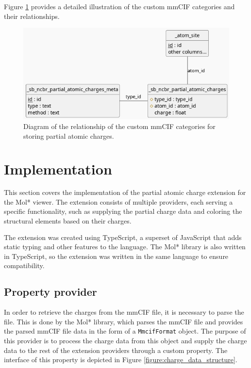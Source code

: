 \documentclass[
  digital,     %
  oneside,     %
  nosansbold,  %
  nocolorbold, %
  lof,         %
  lot,         %
]{fithesis4}
\begin{document}
Figure \ref{fig:mmcif_erd} provides a detailed illustration of the custom mmCIF categories and their relationships.


\begin{figure}
  \begin{center}
    \includegraphics[width=\textwidth]{figures/mmcif_erd.png}
  \end{center}
  \caption[Custom mmCIF category relationships.]{Diagram of the relationship of the custom mmCIF categories for storing partial atomic charges.}
  \label{fig:mmcif_erd}
\end{figure}

\section{Implementation}
\label{section:implementation}


This section covers the implementation of the partial atomic charge extension for the Mol* viewer. The extension consists of multiple providers, each serving a specific functionality, such as supplying the partial charge data and coloring the structural elements based on their charges. 

The extension was created using TypeScript, a superset of JavaScript that adds static typing and other features to the language. The Mol* library is also written in TypeScript, so the extension was written in the same language to ensure compatibility.

\subsection{Property provider}
\label{subsection:property_provider}

In order to retrieve the charges from the mmCIF file, it is necessary to parse the file. This is done by the Mol* library, which parses the mmCIF file and provides the parsed mmCIF file data in the form of a \texttt{MmcifFormat} object. The purpose of this provider is to process the charge data from this object and supply the charge data to the rest of the extension providers through a custom property. The interface of this property is depicted in Figure \ref{figure:charge_data_structure}.
\end{document}

